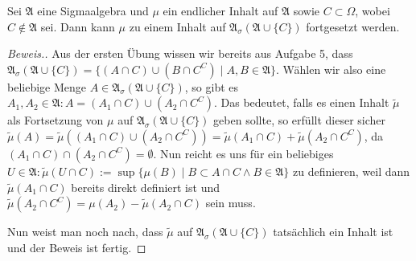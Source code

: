 \begin{lemma}
    Sei $\mathfrak{A}$ eine Sigmaalgebra und $\mu$ ein endlicher Inhalt auf $\mathfrak{A}$ sowie $C\subset\Omega$, wobei $C\notin\mathfrak{A}$ sei. Dann kann $\mu$ zu einem Inhalt auf $\mathfrak{A}_\sigma(\mathfrak{A}\cup\{C\})$ fortgesetzt werden.
\end{lemma}

\begin{proof}[Beweis.]
    Aus der ersten Übung wissen wir bereits aus Aufgabe 5, dass $\mathfrak{A}_\sigma(\mathfrak{A}\cup\{C\})=\{(A\cap C)\cup(B\cap C^C)\mid A,B\in\mathfrak{A}\}$. Wählen wir also eine beliebige Menge $A\in\mathfrak{A}_\sigma(\mathfrak{A}\cup\{C\})$, so gibt es $A_1,A_2\in\mathfrak{A}:A=\left(A_1\cap C\right)\cup\left(A_2\cap C^C\right)$. Das bedeutet, falls es einen Inhalt $\tilde{\mu}$ als Fortsetzung von $\mu$ auf $\mathfrak{A}_\sigma(\mathfrak{A}\cup\{C\})$ geben sollte, so erfüllt dieser sicher $\tilde{\mu}(A)=\tilde{\mu}((A_1\cap C)\cup(A_2\cap C^C))=\tilde{\mu}(A_1\cap C)+\tilde{\mu}(A_2\cap C^C)$, da $(A_1\cap C)\cap(A_2\cap C^C)=\emptyset$. Nun reicht es uns für ein beliebiges $U\in\mathfrak{A}:\tilde{\mu}(U\cap C):=\sup\{\mu(B)\mid B\subset A\cap C\land B\in\mathfrak{A}\}$ zu definieren, weil dann $\tilde{\mu}(A_1\cap C)$ bereits direkt definiert ist und $\tilde{\mu}(A_2\cap C^C)=\mu(A_2)-\tilde{\mu}(A_2\cap C)$ sein muss.
    
    Nun weist man  noch nach, dass $\tilde{\mu}$ auf $\mathfrak{A}_\sigma(\mathfrak{A}\cup\{C\})$ tatsächlich ein Inhalt ist und der Beweis ist fertig.
\end{proof}